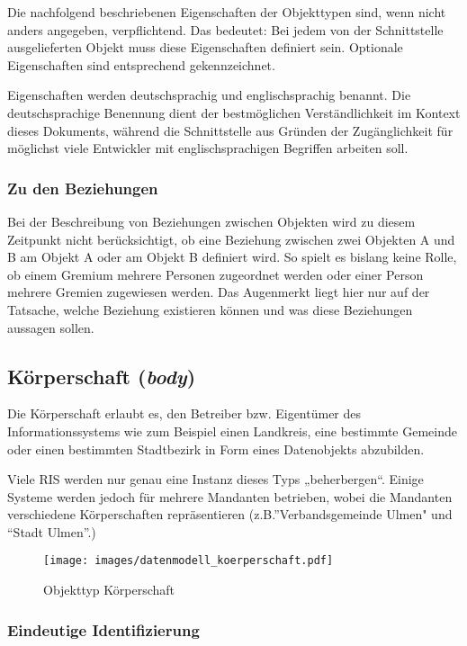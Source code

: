 \documentclass[,a4paper]{article}
\makeatletter
\def\maxwidth{\ifdim\Gin@nat@width>\linewidth\linewidth
\else\Gin@nat@width\fi}
\let\Oldincludegraphics\includegraphics
\renewcommand{\includegraphics}[1]{\Oldincludegraphics[width=\maxwidth]{#1}}
\makeatother
\begin{document}
Die nachfolgend beschriebenen Eigenschaften der Objekttypen sind, wenn
nicht anders angegeben, verpflichtend. Das bedeutet: Bei jedem von der
Schnittstelle ausgelieferten Objekt muss diese Eigenschaften definiert
sein. Optionale Eigenschaften sind entsprechend gekennzeichnet.

Eigenschaften werden deutschsprachig und englischsprachig benannt. Die
deutschsprachige Benennung dient der bestmöglichen Verständlichkeit im
Kontext dieses Dokuments, während die Schnittstelle aus Gründen der
Zugänglichkeit für möglichst viele Entwickler mit englischsprachigen
Begriffen arbeiten soll.

\subsubsection{Zu den Beziehungen}

Bei der Beschreibung von Beziehungen zwischen Objekten wird zu diesem
Zeitpunkt nicht berücksichtigt, ob eine Beziehung zwischen zwei Objekten
A und B am Objekt A oder am Objekt B definiert wird. So spielt es
bislang keine Rolle, ob einem Gremium mehrere Personen zugeordnet werden
oder einer Person mehrere Gremien zugewiesen werden. Das Augenmerkt
liegt hier nur auf der Tatsache, welche Beziehung existieren können und
was diese Beziehungen aussagen sollen.

\subsection{Körperschaft (\emph{body})}

Die Körperschaft erlaubt es, den Betreiber bzw. Eigentümer des
Informationssystems wie zum Beispiel einen Landkreis, eine bestimmte
Gemeinde oder einen bestimmten Stadtbezirk in Form eines Datenobjekts
abzubilden.

Viele RIS werden nur genau eine Instanz dieses Typs „beherbergen``.
Einige Systeme werden jedoch für mehrere Mandanten betrieben, wobei die
Mandanten verschiedene Körperschaften repräsentieren
(z.B.''Verbandsgemeinde Ulmen" und ``Stadt Ulmen''.)

\begin{figure}[htbp]
\centering
\texttt{[image: images/datenmodell\_koerperschaft.pdf]}
\caption{Objekttyp Körperschaft}
\end{figure}

\subsubsection{Eindeutige Identifizierung}
\end{document}

